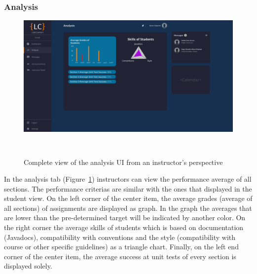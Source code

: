 \documentclass[a4paper, 12pt]{article}
\begin{document}
    
    
    
    
    
    
    
    
    
    
    
    
    \pagebreak
    
    \subsubsection{Analysis}
    
    \begin{figure}[H]
        \centering
        \includegraphics[width=\textwidth]{instructor_analysis}
        \caption{Complete view of the analysis UI from an instructor's perspective}~\label{fig:instructor_analysis_full}
    \end{figure}

    In the analysis tab (Figure~\ref{fig:instructor_analysis_full}) instructors can view the performance average of all sections. The performance criterias are similar with the ones that displayed in the student view.
    On the left corner of the center item, the average grades (average of all sections) of assignments are displayed as graph. In the graph the averages that are lower than the 
    pre-determined target will be indicated by another color. On the right corner the average skills of students which is based on documentation (Javadocs), compatibility with 
    conventions and the style (compatibility with course or other specific guidelines) as a triangle chart. Finally, on the left end corner of the center item, the average 
    success at unit tests of every section is displayed solely. 
    
    
    \pagebreak
    
\end{document}
